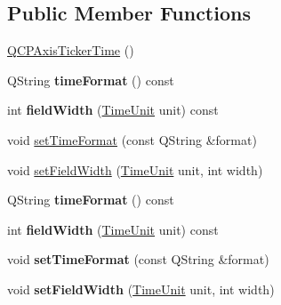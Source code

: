 \subsection*{Public Member Functions}
\begin{DoxyCompactItemize}
\item 
\hyperlink{class_q_c_p_axis_ticker_time_a5145aac1d2117fdac411d9e8552cc41b}{Q\+C\+P\+Axis\+Ticker\+Time} ()
\item 
Q\+String {\bfseries time\+Format} () const \hypertarget{class_q_c_p_axis_ticker_time_a7131ca197593d941adaea6faa75249d0}{}\label{class_q_c_p_axis_ticker_time_a7131ca197593d941adaea6faa75249d0}

\item 
int {\bfseries field\+Width} (\hyperlink{class_q_c_p_axis_ticker_time_a5c48ded8c6d3a1aca9b68219469fea3e}{Time\+Unit} unit) const \hypertarget{class_q_c_p_axis_ticker_time_a13f16bf1335ab365a841496c27a6b71c}{}\label{class_q_c_p_axis_ticker_time_a13f16bf1335ab365a841496c27a6b71c}

\item 
void \hyperlink{class_q_c_p_axis_ticker_time_a2f30b6e5125bce4256be9ce3177088ea}{set\+Time\+Format} (const Q\+String \&format)
\item 
void \hyperlink{class_q_c_p_axis_ticker_time_adc13e54fc969be98a5c0e3fa0dbaa293}{set\+Field\+Width} (\hyperlink{class_q_c_p_axis_ticker_time_a5c48ded8c6d3a1aca9b68219469fea3e}{Time\+Unit} unit, int width)
\item 
Q\+String {\bfseries time\+Format} () const \hypertarget{class_q_c_p_axis_ticker_time_a7131ca197593d941adaea6faa75249d0}{}\label{class_q_c_p_axis_ticker_time_a7131ca197593d941adaea6faa75249d0}

\item 
int {\bfseries field\+Width} (\hyperlink{class_q_c_p_axis_ticker_time_a5c48ded8c6d3a1aca9b68219469fea3e}{Time\+Unit} unit) const \hypertarget{class_q_c_p_axis_ticker_time_a13f16bf1335ab365a841496c27a6b71c}{}\label{class_q_c_p_axis_ticker_time_a13f16bf1335ab365a841496c27a6b71c}

\item 
void {\bfseries set\+Time\+Format} (const Q\+String \&format)\hypertarget{class_q_c_p_axis_ticker_time_a2f30b6e5125bce4256be9ce3177088ea}{}\label{class_q_c_p_axis_ticker_time_a2f30b6e5125bce4256be9ce3177088ea}

\item 
void {\bfseries set\+Field\+Width} (\hyperlink{class_q_c_p_axis_ticker_time_a5c48ded8c6d3a1aca9b68219469fea3e}{Time\+Unit} unit, int width)\hypertarget{class_q_c_p_axis_ticker_time_adc13e54fc969be98a5c0e3fa0dbaa293}{}\label{class_q_c_p_axis_ticker_time_adc13e54fc969be98a5c0e3fa0dbaa293}

\end{DoxyCompactItemize}
